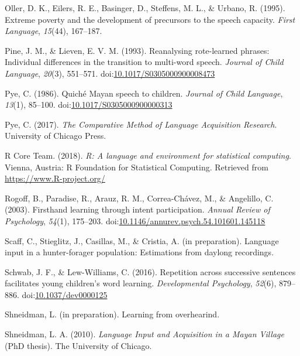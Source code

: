 \documentclass[,man,floatsintext]{apa6}
\begin{document}
\hypertarget{ref-oller1995extreme}{}
Oller, D. K., Eilers, R. E., Basinger, D., Steffens, M. L., \& Urbano,
R. (1995). Extreme poverty and the development of precursors to the
speech capacity. \emph{First Language}, \emph{15}(44), 167--187.

\hypertarget{ref-pine1993reanalysing}{}
Pine, J. M., \& Lieven, E. V. M. (1993). Reanalysing rote-learned
phrases: Individual differences in the transition to multi-word speech.
\emph{Journal of Child Language}, \emph{20}(3), 551--571.
doi:\href{https://doi.org/10.1017/S0305000900008473}{10.1017/S0305000900008473}

\hypertarget{ref-pye1986quiche}{}
Pye, C. (1986). Quiché Mayan speech to children. \emph{Journal of Child
Language}, \emph{13}(1), 85--100.
doi:\href{https://doi.org/10.1017/S0305000900000313}{10.1017/S0305000900000313}

\hypertarget{ref-pye2017comparative}{}
Pye, C. (2017). \emph{The Comparative Method of Language Acquisition
Research}. University of Chicago Press.

\hypertarget{ref-R-base}{}
R Core Team. (2018). \emph{R: A language and environment for statistical
computing}. Vienna, Austria: R Foundation for Statistical Computing.
Retrieved from \url{https://www.R-project.org/}

\hypertarget{ref-rogoff2003firsthand}{}
Rogoff, B., Paradise, R., Arauz, R. M., Correa-Chávez, M., \& Angelillo,
C. (2003). Firsthand learning through intent participation. \emph{Annual
Review of Psychology}, \emph{54}(1), 175--203.
doi:\href{https://doi.org/10.1146/annurev.psych.54.101601.145118}{10.1146/annurev.psych.54.101601.145118}

\hypertarget{ref-scaffIPlanguage}{}
Scaff, C., Stieglitz, J., Casillas, M., \& Cristia, A. (in preparation).
Language input in a hunter-forager population: Estimations from daylong
recordings.

\hypertarget{ref-schwab2016repetition}{}
Schwab, J. F., \& Lew-Williams, C. (2016). Repetition across successive
sentences facilitates young children's word learning.
\emph{Developmental Psychology}, \emph{52}(6), 879--886.
doi:\href{https://doi.org/10.1037/dev0000125}{10.1037/dev0000125}

\hypertarget{ref-shneidmanIPoverhearing}{}
Shneidman, L. (in preparation). Learning from overhearind.

\hypertarget{ref-shneidman2010language}{}
Shneidman, L. A. (2010). \emph{Language Input and Acquisition in a Mayan
Village} (PhD thesis). The University of Chicago.
\end{document}
